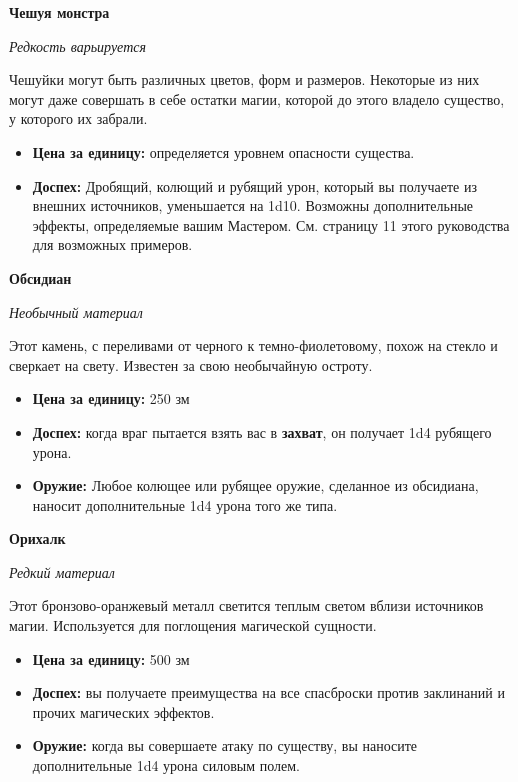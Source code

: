 \documentclass[a4paper, 9pt, twocolumn]{book}
\begin{document}
	\noindent \textbf{Чешуя монстра}
	
	\noindent \textit{Редкость варьируется}
	
	\smallskip
	
	\noindent Чешуйки могут быть различных цветов, форм и размеров. Некоторые из них могут даже совершать в себе остатки магии, которой до этого владело существо, у которого их забрали.
	
	\begin{itemize}
		\item \textbf{Цена за единицу:} определяется уровнем опасности существа.
		
		\item \textbf{Доспех:} Дробящий, колющий и рубящий урон, который вы получаете из внешних источников, уменьшается на 1d10. Возможны дополнительные эффекты, определяемые вашим Мастером. См. страницу 11 этого руководства для возможных примеров. %
	\end{itemize}

	\noindent \textbf{Обсидиан}
	
	\noindent \textit{Необычный материал}
	
	\smallskip 
	
	\noindent Этот камень, с переливами от черного к темно-фиолетовому, похож на стекло и сверкает на свету. Известен за свою необычайную остроту.
	
	\begin{itemize}
		\item \textbf{Цена за единицу:} 250 зм
		
		\item \textbf{Доспех:} когда враг пытается взять вас в \textbf{захват}, он получает 1d4 рубящего урона.
		
		\item \textbf{Оружие:} Любое колющее или рубящее оружие, сделанное из обсидиана, наносит дополнительные 1d4 урона того же типа. 
	\end{itemize}

	\noindent \textbf{Орихалк}
	
	\noindent \textit{Редкий материал}
	
	\smallskip 
	
	\noindent Этот бронзово-оранжевый металл светится теплым светом вблизи источников магии. Используется для поглощения магической сущности.
	
	\begin{itemize}
		\item \textbf{Цена за единицу:} 500 зм
		
		\item \textbf{Доспех:} вы получаете преимущества на все спасброски против заклинаний и прочих магических эффектов.
		
		\item \textbf{Оружие:} когда вы совершаете атаку по существу, вы наносите дополнительные 1d4 урона силовым полем. 
	\end{itemize}
\end{document}
